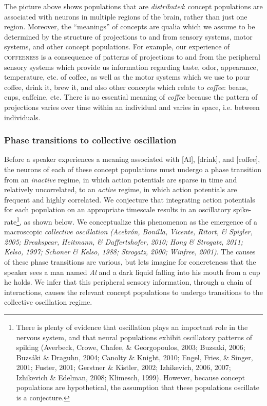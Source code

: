   The picture above shows populations that are \textit{distributed}: concept populations are associated with neurons in multiple regions of the brain, rather than just one region. Moreover, the “meanings” of concepts are qualia which we assume to be determined by the structure of projections to and from sensory systems, motor systems, and other concept populations. For example, our experience of \textsc{coffeeness} is a consequence of patterns of projections to and from the peripheral sensory systems which provide us information regarding taste, odor, appearance, temperature, etc. of coffee, as well as the motor systems which we use to pour coffee, drink it, brew it, and also other concepts which relate to \textit{coffee}: beans, cups, caffeine, etc. There is no essential meaning of \textit{coffee} because the pattern of projections varies over time within an individual and varies in space, i.e. between individuals.

\subsubsection{{\textbf{Phase transitions to collective oscillation}}}

Before a speaker experiences a meaning associated with [Al], [drink], and [coffee], the neurons of each of these concept populations must undergo a phase transition from an \textit{inactive} regime, in which action potentials are sparse in time and relatively uncorrelated, to an \textit{active} regime, in which action potentials are frequent and highly correlated. We conjecture that integrating action potentials for each population on an appropriate timescale results in an oscillatory spike-rate\footnote{There is plenty of evidence that oscillation plays an important role in the nervous system, and that neural populations exhibit oscillatory patterns of spiking (Averbeck, Crowe, Chafee, \& Georgopoulos, 2003; Buzsaki, 2006; Buzsáki \& Draguhn, 2004; Canolty \& Knight, 2010; Engel, Fries, \& Singer, 2001; Fuster, 2001; Gerstner \& Kistler, 2002; Izhikevich, 2006, 2007; Izhikevich \& Edelman, 2008; Klimesch, 1999). However, because concept populations are hypothetical, the assumption that these populations oscillate is a conjecture.}, as shown below. We conceptualize this phenomenon as the emergence of a macroscopic \textit{collective} \textit{oscillation} \textit{(Acebrón,} \textit{Bonilla,} \textit{Vicente,} \textit{Ritort,} \textit{\&} \textit{Spigler,} \textit{2005;} \textit{Breakspear,} \textit{Heitmann,} \textit{\&} \textit{Daffertshofer,} \textit{2010;} \textit{Hong} \textit{\&} \textit{Strogatz,} \textit{2011;} \textit{Kelso,} \textit{1997;} \textit{Schoner} \textit{\&} \textit{Kelso,} \textit{1988;} \textit{Strogatz,} \textit{2000;} \textit{Winfree,} \textit{2001)}. The causes of these phase transitions are various, but lets imagine for concreteness that the speaker sees a man named \textit{Al} and a dark liquid falling into his mouth from a cup he holds. We infer that this peripheral sensory information, through a chain of interactions, causes the relevant concept populations to undergo transitions to the collective oscillation regime.

